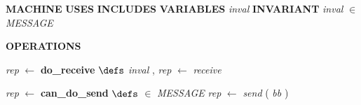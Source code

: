 %
\bsetindent
\begin{tabbing}
\bSetTabs
%
%
\bbnl
{\bf MACHINE} \bhsp{} \-\label{Receiver}
%
%
\bbnl
{\bf USES} \label{Bool_TYPE}
%
%
\bbnl
{\bf INCLUDES} \label{SecureNetwork}
%
%
\bbnl
{\bf VARIABLES} \+ \bbnl
{\em inval\/}\label{inval}  \-
%
%
\bbnl
{\bf INVARIANT} \+ \bbnl
{\em inval\/} $\in$ {\em MESSAGE\/}\label{MESSAGE}
\end{tabbing}
\bresetindent
%
%
\vspace{-4.5ex}\bsetindent
\begin{tabbing}
\bSetTabs
\+\> \-
%
%
\bnl\bnl
{\bf OPERATIONS} \+ \bbnl

%
%
{\em rep\/} $\longleftarrow$  {\bf { do\_receive}}  \bhsp $\defs$ \+ \bnl
{\em inval\/} , {\em rep\/} $\longleftarrow$ {\em receive\/}\label{receive}  \- \bOperationSemiColon 
\end{tabbing}
\bresetindent
%
%
\vspace{-4.5ex}\bsetindent
\begin{tabbing}
\bSetTabs
\+\>
%
%
{\em rep\/} $\longleftarrow$  {\bf { can\_do\_send}}  \bhsp $\defs$ \+ \bnl
  \+\bnl
{}  \-\bnl
{}  $\in$ {\em MESSAGE\/}\label{MESSAGE}  \-\bnl
{} \+\bnl
{\em rep\/} $\longleftarrow$ {\em send\/}\label{send}  ( {\em bb\/} )  \-\bnl
{}  \-\bnl
{}  \-
\end{tabbing}
\bresetindent
%
%
